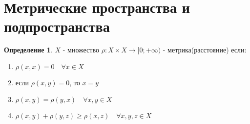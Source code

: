 \documentclass[12pt,letterpaper]{report}
\theoremstyle{definition}
\newtheorem*{conj}{Определение}
\begin{document}
\section{Метрические пространства и подпространства}
    \begin{conj}
        $X$ - множество $\rho : X \times X \longrightarrow [0; + \infty)$ - метрика(расстояние)
        если: 
        \begin{enumerate}
            \item $\rho(x, x) = 0 \quad \forall x \in X$
            \item если $\rho(x, y) = 0$, то $x = y$
            \item $\rho(x, y) = \rho(y, x) \quad \forall x, y \in X$
            \item $\rho(x, y) + \rho(y, z) \geqslant \rho(x, z) \quad \forall x, y, z \in X$
        \end{enumerate}
    \end{conj}
\end{document}
